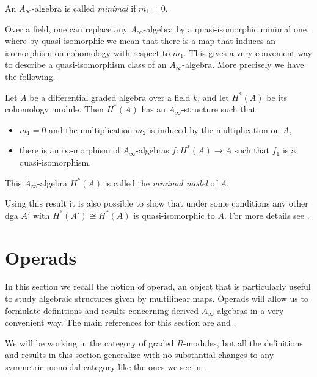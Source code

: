 \documentclass[Thesis.tex]{subfiles}
\begin{document}
\begin{defin}\label{minimal}
An $A_\infty$-algebra is called \emph{minimal} if $m_1 = 0$.
\end{defin}

Over a field, one can replace any $A_\infty$-algebra by a quasi-isomorphic minimal one, where by quasi-isomorphic we mean that there is a map that induces an isomorphism on cohomology with respect to $m_1$. This gives a very convenient way to describe a quasi-isomorphism class of an $A_\infty$-algebra. More precisely we have the following.

\begin{thm}[Kadeishvili]\label{minimaltheorem} Let $A$ be a differential graded algebra over a field $k$, and let $H^*(A)$ be its cohomology module. Then $H^*(A)$ has an $A_\infty$-structure such that
\begin{itemize}
\item $m_1 = 0$ and the multiplication $m_2$ is induced by the multiplication on $A$,
\item there is an $\infty$-morphism of $A_\infty$-algebras $f : H^*(A) \to A$ such that $f_1$ is a quasi-isomorphism.
\end{itemize}
This $A_\infty$-algebra $H^*(A)$ is called the \emph{minimal model} of $A$.
\end{thm}

Using this result it is also possible to show that under some conditions any other dga $A'$ with $H^*(A')\cong H^*(A)$ is quasi-isomorphic to $A$. For more details see \cite{kade}.
\section{Operads}\label{back3}

In this section we recall the notion of operad, an object that is particularly useful to study algebraic structures given by multilinear maps. Operads will allow us to formulate definitions and results concerning derived $A_\infty$-algebras in a very convenient way. The main references for this section are \cite{lodayvallette} and \cite{ward}.

We will be working in the category of graded $R$-modules, but all the definitions and results in this section generalize with no substantial changes to any symmetric monoidal category like the ones we see in . 
\end{document}
